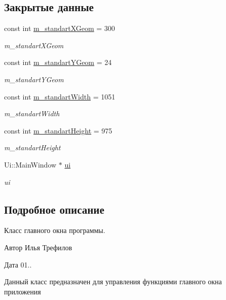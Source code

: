 \subsection*{Закрытые данные}
\begin{DoxyCompactItemize}
\item 
const int \hyperlink{classMainWindow_a46d1e00d9af1678f68303e2f04a6a541}{m\+\_\+standart\+X\+Geom} = 300
\begin{DoxyCompactList}\small\item\em m\+\_\+standart\+X\+Geom \end{DoxyCompactList}\item 
const int \hyperlink{classMainWindow_a8ff8787bb09d87248d74e152d2133926}{m\+\_\+standart\+Y\+Geom} = 24
\begin{DoxyCompactList}\small\item\em m\+\_\+standart\+Y\+Geom \end{DoxyCompactList}\item 
const int \hyperlink{classMainWindow_a2aa939210e4ccc0fdbec8fd7e4497617}{m\+\_\+standart\+Width} = 1051
\begin{DoxyCompactList}\small\item\em m\+\_\+standart\+Width \end{DoxyCompactList}\item 
const int \hyperlink{classMainWindow_a5ebb2638e7863a72adc4e6f75336bd77}{m\+\_\+standart\+Height} = 975
\begin{DoxyCompactList}\small\item\em m\+\_\+standart\+Height \end{DoxyCompactList}\item 
Ui\+::\+Main\+Window $\ast$ \hyperlink{classMainWindow_a35466a70ed47252a0191168126a352a5}{ui}
\begin{DoxyCompactList}\small\item\em ui \end{DoxyCompactList}\end{DoxyCompactItemize}


\subsection{Подробное описание}
Класс главного окна программы. 

\begin{DoxyAuthor}{Автор}
Илья Трефилов 
\end{DoxyAuthor}
\begin{DoxyDate}{Дата}
01..
\end{DoxyDate}
Данный класс предназначен для управления функциями главного окна приложения 

